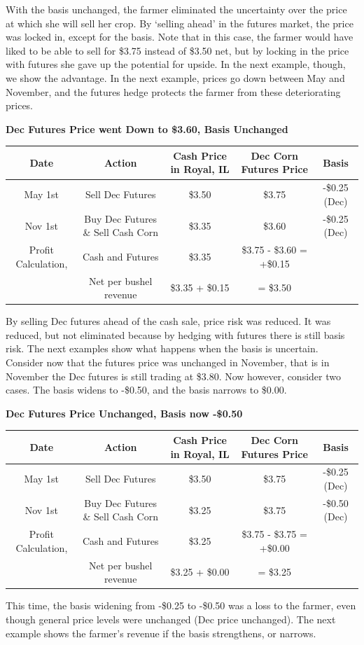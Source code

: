 \documentclass[
]{book}
\begin{document}
With the basis unchanged, the farmer eliminated the uncertainty over the price at which she will sell her crop. By `selling ahead' in the futures market, the price was locked in, except for the basis. Note that in this case, the farmer would have liked to be able to sell for \$3.75 instead of \$3.50 net, but by locking in the price with futures she gave up the potential for upside. In the next example, though, we show the advantage. In the next example, prices go down between May and November, and the futures hedge protects the farmer from these deteriorating prices.

\textbf{Dec Futures Price went Down to \$3.60, Basis Unchanged}

\begin{longtable}[]{@{}ccccc@{}}
\toprule
Date & Action & Cash Price in Royal, IL & Dec Corn Futures Price & Basis\tabularnewline
\midrule
\endhead
May 1st & Sell Dec Futures & \$3.50 & \$3.75 & -\$0.25 (Dec)\tabularnewline
Nov 1st & Buy Dec Futures \& Sell Cash Corn & \$3.35 & \$3.60 & -\$0.25 (Dec)\tabularnewline
Profit Calculation, & Cash and Futures & \$3.35 & \$3.75 - \$3.60 = +\$0.15 &\tabularnewline
& Net per bushel revenue & \$3.35 + \$0.15 & = \$3.50 &\tabularnewline
\bottomrule
\end{longtable}

By selling Dec futures ahead of the cash sale, price risk was reduced. It was reduced, but not eliminated because by hedging with futures there is still basis risk. The next examples show what happens when the basis is uncertain. Consider now that the futures price was unchanged in November, that is in November the Dec futures is still trading at \$3.80. Now however, consider two cases. The basis widens to -\$0.50, and the basis narrows to \$0.00.

\textbf{Dec Futures Price Unchanged, Basis now -\$0.50}

\begin{longtable}[]{@{}ccccc@{}}
\toprule
Date & Action & Cash Price in Royal, IL & Dec Corn Futures Price & Basis\tabularnewline
\midrule
\endhead
May 1st & Sell Dec Futures & \$3.50 & \$3.75 & -\$0.25 (Dec)\tabularnewline
Nov 1st & Buy Dec Futures \& Sell Cash Corn & \$3.25 & \$3.75 & -\$0.50 (Dec)\tabularnewline
Profit Calculation, & Cash and Futures & \$3.25 & \$3.75 - \$3.75 = +\$0.00 &\tabularnewline
& Net per bushel revenue & \$3.25 + \$0.00 & = \$3.25 &\tabularnewline
\bottomrule
\end{longtable}

This time, the basis widening from -\$0.25 to -\$0.50 was a loss to the farmer, even though general price levels were unchanged (Dec price unchanged). The next example shows the farmer's revenue if the basis strengthens, or narrows.
\end{document}
